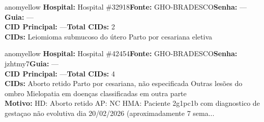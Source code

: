 \documentclass[a4paper,10pt]{article}
\begin{document}
\begin{anomalycard}[Interna\c{c}\~{a}o \#119896 | Pac. \#99341 | MODERADO (z=2.70) | LOS: 4d | 02/03/2026\,$\to$\,06/03/2026]{anomyellow}
\textbf{Hospital:} Hospital \#32918\quad \textbf{Fonte:} GHO-BRADESCO\quad \textbf{Senha:} ---\quad \textbf{Guia:} ---\\

\textbf{CID Principal:} {\small ---}\quad\textbf{Total CIDs:} 2\\

\textbf{CIDs:} {\scriptsize Leiomioma submucoso do útero \textbar{} Parto por cesariana eletiva}\\



\end{anomalycard}


\begin{anomalycard}[Interna\c{c}\~{a}o \#118108 | Pac. \#98003 | MODERADO (z=2.68) | LOS: 1d | 22/02/2026\,$\to$\,23/02/2026]{anomyellow}
\textbf{Hospital:} Hospital \#42454\quad \textbf{Fonte:} GHO-BRADESCO\quad \textbf{Senha:} jzhtmy7\quad \textbf{Guia:} ---\\

\textbf{CID Principal:} {\small ---}\quad\textbf{Total CIDs:} 4\\

\textbf{CIDs:} {\scriptsize Aborto retido \textbar{} Parto por cesariana, não especificada \textbar{} Outras lesões do ombro \textbar{} Mielopatia em doenças classificadas em outra parte}\\

\textbf{Motivo:} {\scriptsize HD: Aborto retido  AP: NC HMA: Paciente 2g1pc1b com diagnostico de gestaçao não evolutiva dia 20/02/2026 (aproximadamente 7 sema...}\\



\end{anomalycard}
\end{document}
